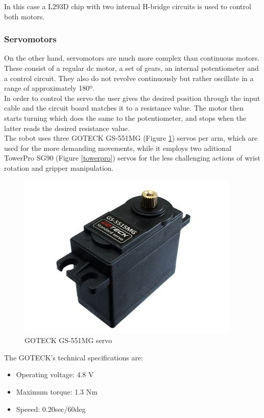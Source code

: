 	In this case a L293D chip with two internal H-bridge circuits is used to control both motors.

	\subsubsection{Servomotors}

	On the other hand, servomotors are much more complex than continuous motors. These consist of a regular dc motor, a set of gears, an internal potentiometer and a control circuit. They also do not revolve continuously but rather oscillate in a range of approximately 180º.	\\

	In order to control the servo the user gives the desired position through the input cable and the circuit board matches it to a resistance value. The motor then starts turning which does the same to the potentiometer, and stops when the latter reads the desired resistance value.\\

	The robot uses three GOTECK GS-551MG (Figure \ref{goteck}) servos per arm, which are used for the more demanding movements, while it employs two aditional TowerPro SG90 (Figure \ref{towerpro}) servos for the less challenging actions of wrist rotation and gripper manipulation.

		\begin{figure}[H]
			\centering
			\includegraphics[scale=0.5]{images/ProjectComponents/servo1.jpg}
			\caption{GOTECK GS-551MG servo }
			\label{goteck}
		\end{figure}
		\bigskip

	The GOTECK's technical specifications are:
			\begin{itemize}
				\item Operating voltage: 4.8 V
				\item Maximum torque: 1.3 Nm    
				\item Speeed: 0.20sec/60deg
			\end{itemize}	

